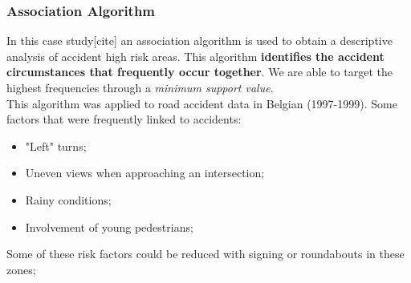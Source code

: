 \documentclass[hyperref={pdfpagelabels=true}]{beamer}
\begin{document}
\begin{frame}
\frametitle{Association Algorithm}
In this case study[cite] an association algorithm is used to obtain a descriptive analysis of accident high risk areas. This algorithm \textbf{identifies the accident circumstances that frequently occur together}. We are able to target the highest frequencies through a \textit{minimum support value}.\\
This algorithm was applied to road accident data in Belgian (1997-1999). 
Some factors that were frequently linked to accidents:
\begin{itemize}
\item "Left" turns;
\item Uneven views when approaching an intersection;
\item Rainy conditions;
\item Involvement of young pedestrians;
\end{itemize}
Some of these risk factors could be reduced with signing or roundabouts in these zones;
\end{frame}

\end{document}
